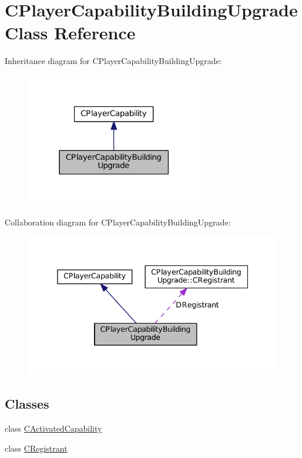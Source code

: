 \hypertarget{classCPlayerCapabilityBuildingUpgrade}{}\section{C\+Player\+Capability\+Building\+Upgrade Class Reference}
\label{classCPlayerCapabilityBuildingUpgrade}


Inheritance diagram for C\+Player\+Capability\+Building\+Upgrade\+:\nopagebreak
\begin{figure}[H]
\begin{center}
\leavevmode
\includegraphics[width=219pt]{classCPlayerCapabilityBuildingUpgrade__inherit__graph}
\end{center}
\end{figure}


Collaboration diagram for C\+Player\+Capability\+Building\+Upgrade\+:\nopagebreak
\begin{figure}[H]
\begin{center}
\leavevmode
\includegraphics[width=338pt]{classCPlayerCapabilityBuildingUpgrade__coll__graph}
\end{center}
\end{figure}
\subsection*{Classes}
\begin{DoxyCompactItemize}
\item 
class \hyperlink{classCPlayerCapabilityBuildingUpgrade_1_1CActivatedCapability}{C\+Activated\+Capability}
\item 
class \hyperlink{classCPlayerCapabilityBuildingUpgrade_1_1CRegistrant}{C\+Registrant}
\end{DoxyCompactItemize}
